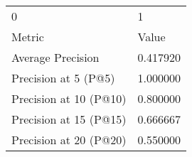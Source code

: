 \begin{tabular}{ll}
0 & 1 \\
Metric & Value \\
Average Precision & 0.417920 \\
Precision at 5 (P@5) & 1.000000 \\
Precision at 10 (P@10) & 0.800000 \\
Precision at 15 (P@15) & 0.666667 \\
Precision at 20 (P@20) & 0.550000 \\
\end{tabular}
